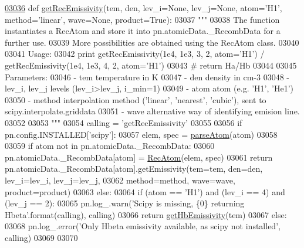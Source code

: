 \begin{DoxyCode}
\hypertarget{namespacepyneb_1_1core_1_1pynebcore_l03036}{}\hyperlink{namespacepyneb_1_1core_1_1pynebcore_aba9d4a5306330dd47f8a51455514c017}{03036} \textcolor{keyword}{def }\hyperlink{namespacepyneb_1_1core_1_1pynebcore_aba9d4a5306330dd47f8a51455514c017}{getRecEmissivity}(tem, den, lev\_i=None, lev\_j=None, atom='H1', method='linear', 
      wave=None, product=True):
03037     \textcolor{stringliteral}{"""}
03038 \textcolor{stringliteral}{    The function instantiates a RecAtom and store it into pn.atomicData.\_RecombData for a further use.}
03039 \textcolor{stringliteral}{    More possibilities are obtained using the RecAtom class.}
03040 \textcolor{stringliteral}{}
03041 \textcolor{stringliteral}{    Usage:}
03042 \textcolor{stringliteral}{        print getRecEmissivity(1e4, 1e3, 3, 2, atom='H1') / getRecEmissivity(1e4, 1e3, 4, 2, atom='H1')  }
03043 \textcolor{stringliteral}{            # return Ha/Hb }
03044 \textcolor{stringliteral}{}
03045 \textcolor{stringliteral}{    Parameters:}
03046 \textcolor{stringliteral}{        - tem           temperature in K}
03047 \textcolor{stringliteral}{        - den           density in cm-3}
03048 \textcolor{stringliteral}{        - lev\_i, lev\_j  levels (lev\_i>lev\_j, i\_min=1)}
03049 \textcolor{stringliteral}{        - atom          atom (e.g. 'H1', 'He1')}
03050 \textcolor{stringliteral}{        - method        interpolation method ('linear', 'nearest', 'cubic'), sent to
       scipy.interpolate.griddata}
03051 \textcolor{stringliteral}{        - wave          alternative way of identifying emision line.}
03052 \textcolor{stringliteral}{        }
03053 \textcolor{stringliteral}{    """}
03054     calling = \textcolor{stringliteral}{'getRecEmissivity'}
03055     
03056     \textcolor{keywordflow}{if} pn.config.INSTALLED[\textcolor{stringliteral}{'scipy'}]:
03057         elem, spec = \hyperlink{namespacepyneb_1_1utils_1_1misc_a8c069186002a3e73dd474958e35034d5}{parseAtom}(atom)
03058     
03059         \textcolor{keywordflow}{if} atom \textcolor{keywordflow}{not} \textcolor{keywordflow}{in} pn.atomicData.\_RecombData:
03060             pn.atomicData.\_RecombData[atom] = \hyperlink{classpyneb_1_1core_1_1pynebcore_1_1_rec_atom}{RecAtom}(elem, spec)
03061         \textcolor{keywordflow}{return} pn.atomicData.\_RecombData[atom].getEmissivity(tem=tem, den=den, lev\_i=lev\_i, lev\_j=lev\_j,
03062                                                              method=method, wave=wave, product=product)
03063     \textcolor{keywordflow}{else}:
03064         \textcolor{keywordflow}{if} (atom == \textcolor{stringliteral}{'H1'}) \textcolor{keywordflow}{and} (lev\_i == 4) \textcolor{keywordflow}{and} (lev\_j == 2):
03065             pn.log\_.warn(\textcolor{stringliteral}{'Scipy is missing, \{0\} returning Hbeta'}.format(calling), calling)
03066             \textcolor{keywordflow}{return} \hyperlink{namespacepyneb_1_1core_1_1pynebcore_a027537ead17492a35c3e4e940cd95223}{getHbEmissivity}(tem)
03067         \textcolor{keywordflow}{else}:
03068             pn.log\_.error(\textcolor{stringliteral}{'Only Hbeta emissivity available, as scipy not installed'}, calling)
03069 
03070 
\end{DoxyCode}
